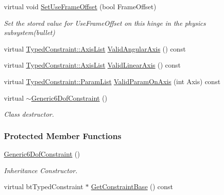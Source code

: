 \begin{DoxyCompactItemize}
\item 
virtual void \hyperlink{classphys_1_1Generic6DofConstraint_a5e3fcf0fe6d85ecad2a883010215e983}{SetUseFrameOffset} (bool FrameOffset)
\begin{DoxyCompactList}\small\item\em Set the stored value for UseFrameOffset on this hinge in the physics subsystem(bullet) \item\end{DoxyCompactList}\item 
virtual \hyperlink{classphys_1_1TypedConstraint_a26261a4055e84e104c58d84eea5667c2}{TypedConstraint::AxisList} \hyperlink{classphys_1_1Generic6DofConstraint_a08d49caf73c49a4a196ed0cd2eca6a8e}{ValidAngularAxis} () const 
\item 
virtual \hyperlink{classphys_1_1TypedConstraint_a26261a4055e84e104c58d84eea5667c2}{TypedConstraint::AxisList} \hyperlink{classphys_1_1Generic6DofConstraint_a2148eeda4ddfa9dd14f3f16ff1799a13}{ValidLinearAxis} () const 
\item 
virtual \hyperlink{classphys_1_1TypedConstraint_a4c2dcea3fbb764e454840329126d034e}{TypedConstraint::ParamList} \hyperlink{classphys_1_1Generic6DofConstraint_a937a090c9520a64bc72b85cb95c853dc}{ValidParamOnAxis} (int Axis) const 
\item 
\hypertarget{classphys_1_1Generic6DofConstraint_af5f9c4c27bdc4437ae49fc5e9c99ac3c}{
virtual \hyperlink{classphys_1_1Generic6DofConstraint_af5f9c4c27bdc4437ae49fc5e9c99ac3c}{$\sim$Generic6DofConstraint} ()}
\label{classphys_1_1Generic6DofConstraint_af5f9c4c27bdc4437ae49fc5e9c99ac3c}

\begin{DoxyCompactList}\small\item\em Class destructor. \item\end{DoxyCompactList}\end{DoxyCompactItemize}
\subsubsection*{Protected Member Functions}
\begin{DoxyCompactItemize}
\item 
\hyperlink{classphys_1_1Generic6DofConstraint_ab897b1d7f04073cae60cf1d2615d04b4}{Generic6DofConstraint} ()
\begin{DoxyCompactList}\small\item\em Inheritance Constructor. \item\end{DoxyCompactList}\item 
virtual btTypedConstraint $\ast$ \hyperlink{classphys_1_1Generic6DofConstraint_ac400e37ab564cfe82efb74caabb0a7cd}{GetConstraintBase} () const 
\end{DoxyCompactItemize}
